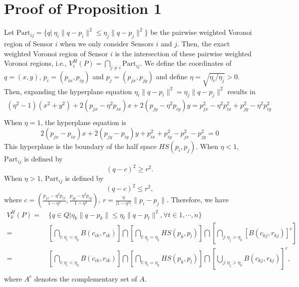 \documentclass[journal,draftcls,onecolumn,12pt,twoside, narroweqnarray]{IEEEtran}
\begin{document}
\appendices
\section{Proof of Proposition 1}
\begin{IEEEproof}
Let $\mbox{Part}_{ij}=\{q|\ \eta_i\|q-p_i\|^2\le\eta_j\|q-p_j\|^2\}$ be the pairwise weighted Voronoi region of Sensor $i$ when we only consider Sensors $i$ and $j$. Then, the exact weighted Voronoi region of Sensor $i$ is the intersection of these pairwise weighted Voronoi regions, i.e., $V^H_i(P)=\bigcap_{j\ne i}{\mbox{Part}_{ij}}$.
We define the coordinates of $q=(x,y)$, $p_i=(p_{ix},p_{iy})$ and $p_j=(p_{jx},p_{jy})$ and define $\eta=\sqrt{\eta_i/\eta_j}>0$. Then, expanding the hyperplane equation
$\eta_i\|q-p_i\|^2 = \eta_j\|q-p_j\|^2$
results in
\begin{equation}
\begin{aligned}
(\eta^2-1)(x^2+y^2)+2(p_{jx}-\eta^2p_{ix})x+2(p_{jy}-\eta^2p_{iy})y = p_{jx}^2-\eta^2p_{ix}^2+p_{jy}^2-\eta^2p_{iy}^2\\
\end{aligned}
\end{equation}
When $\eta=1$, the hyperplane equation is
\begin{equation}
2(p_{jx}-p_{ix})x+2(p_{jy}-p_{iy})y+p_{ix}^2+p_{iy}^2-p_{jx}^2-p_{jy}^2=0
\end{equation}
This hyperplane is the boundary of the half space $HS(p_i,p_j)$.
When $\eta<1$,  $\mbox{Part}_{ij}$ is defined by
\begin{equation}
(q-c)^2\geq r^2.
\end{equation}
When $\eta>1$,  $\mbox{Part}_{ij}$ is defined by
\begin{equation}
(q-c)^2\leq r^2,
\end{equation}
where $c=(\frac{p_{jx}-\eta^2p_{ix}}{1-\eta^2},\frac{p_{jy}-\eta^2p_{iy}}{1-\eta^2})$, $r=\frac{\eta}{|1-\eta^2|}\|p_i-p_j\|$.
Therefore, we have
\begin{equation}
\begin{aligned}
V^H_k(P) {=}&\:\{q \in Q | \eta_k\|q-p_k\| \le \eta_t\|q-p_t\|^2, \forall t \in 1,\cdots,n\}\\
         {=}&\:\left[\bigcap_{i:\eta_i<\eta_k}{B(c_{ik},r_{ik})}\right]\bigcap\left[\bigcap_{l:\eta_l=\eta_k}{HS(p_k,p_l)}\right]\bigcap\left[\bigcap_{j:\eta_j>\eta_k}{\left[B(c_{kj},r_{kj})\right]^c}\right]\\
         {=}&\:\left[\bigcap_{i:\eta_i<\eta_k}{B(c_{ik},r_{ik})}\right]\bigcap\left[\bigcap_{l:\eta_l=\eta_k}{HS(p_k,p_l)}\right]\bigcap\left[\bigcup_{j:\eta_j>\eta_k}{B(c_{kj},r_{kj})}\right]^c,\\
         \end{aligned}
\end{equation}
where $A^c$ denotes the complementary set of $A$.
\end{IEEEproof}
\end{document}
